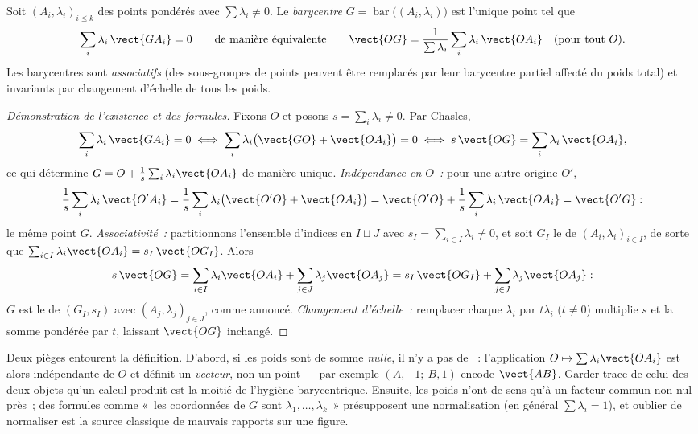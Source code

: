 \begin{definition}[Barycentre]\label{def:b2:affine:barycenter}
Soit $(A_i, \lambda_i)_{i \leq k}$ des points pondérés avec
$\sum\lambda_i \neq 0$. Le \emph{barycentre} $G
= \operatorname{bar}\bigl((A_i, \lambda_i)\bigr)$ est l'unique
point tel que
\[
\sum_i \lambda_i\, \vect{GA_i} = 0
\qquad\text{de manière équivalente}\qquad
\vect{OG} = \frac{1}{\sum\lambda_i}\sum_i \lambda_i\,\vect{OA_i}
\quad (\text{pour tout } O).
\]
Les barycentres sont \emph{associatifs} (des sous-groupes de points
peuvent être remplacés par leur barycentre partiel affecté du poids
total) et invariants par changement d'échelle de tous les poids.
\end{definition}

\begin{proof}[Démonstration de l'existence et des formules]
Fixons $O$ et posons $s = \sum_i\lambda_i \neq 0$. Par Chasles,
\[
\sum_i\lambda_i\,\vect{GA_i} = 0
\iff \sum_i\lambda_i\bigl(\vect{GO} + \vect{OA_i}\bigr) = 0
\iff s\,\vect{OG} = \sum_i\lambda_i\,\vect{OA_i},
\]
ce qui détermine $G = O + \frac1s\sum_i\lambda_i\vect{OA_i}$
de manière unique. \emph{Indépendance en $O$~:} pour une autre origine
$O'$,
\[
\frac1s\sum_i\lambda_i\,\vect{O'A_i}
= \frac1s\sum_i\lambda_i\bigl(\vect{O'O} + \vect{OA_i}\bigr)
= \vect{O'O} + \frac1s\sum_i\lambda_i\,\vect{OA_i}
= \vect{O'G} :
\]
le même point $G$. \emph{Associativité~:} partitionnons l'ensemble
d'indices en $I \sqcup J$ avec $s_I = \sum_{i\in I}\lambda_i \neq 0$,
et soit $G_I$ le  de $(A_i, \lambda_i)_{i\in
I}$, de sorte que $\sum_{i\in I}\lambda_i\vect{OA_i} =
s_I\,\vect{OG_I}$. Alors
\[
s\,\vect{OG}
= \sum_{i\in I}\lambda_i\vect{OA_i} +
\sum_{j\in J}\lambda_j\vect{OA_j}
= s_I\,\vect{OG_I} + \sum_{j\in J}\lambda_j\vect{OA_j} :
\]
$G$ est le  de $(G_I, s_I)$ avec $(A_j,
\lambda_j)_{j\in J}$, comme annoncé. \emph{Changement d'échelle~:}
remplacer chaque $\lambda_i$ par $t\lambda_i$ ($t \neq 0$) multiplie
$s$ et la somme pondérée par $t$, laissant $\vect{OG}$ inchangé.
\end{proof}

\begin{remark}
Deux pièges entourent la définition. D'abord, si les poids sont de
somme \emph{nulle}, il n'y a pas de ~: l'application $O
\mapsto \sum\lambda_i\vect{OA_i}$ est alors indépendante de $O$ et
définit un \emph{vecteur}, non un point --- par exemple
$(A, -1;\ B, 1)$ encode $\vect{AB}$. Garder trace de celui des deux
objets qu'un calcul produit est la moitié de l'hygiène
barycentrique. Ensuite, les poids n'ont de sens qu'à un facteur
commun non nul près~; des formules comme «~les coordonnées
de $G$ sont $\lambda_1, \dots, \lambda_k$~» présupposent une
normalisation (en général $\sum\lambda_i = 1$), et oublier
de normaliser est la source classique de mauvais rapports sur une
figure.
\end{remark}

